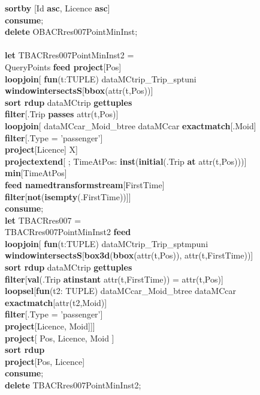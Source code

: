 \documentclass[a4paper]{article}
\newcommand{\op}[1]{\textbf{#1}}
\begin{document}
\begin{scriptsize}
\begin{tabbing}
\>\op{sortby} [Id \op{asc}, Licence \op{asc}]\\
\op{consume};\\
\op{delete} OBACRres007PointMinInst;\\
\\
\op{let} TBACRres007PointMinInst2 =\\
\>QueryPoints \op{feed project}[Pos]\\
\>\op{loopjoin}[ \op{fun}(t:TUPLE) dataMCtrip\_Trip\_sptuni \op{windowintersectsS}[\op{bbox}(attr(t,Pos))]\\
\>\>\op{sort rdup} dataMCtrip \op{gettuples}\\
\>\>\op{filter}[.Trip \op{passes} attr(t,Pos)]\\
\>\>\op{loopjoin}[ dataMCcar\_Moid\_btree dataMCcar \op{exactmatch}[.Moid]\\
\>\>\>\op{filter}[.Type = 'passenger']\\
\>\>\>\op{project}[Licence] {X}]\\
\>\>\op{projectextend}[ ; TimeAtPos: \op{inst}(\op{initial}(.Trip \op{at} attr(t,Pos)))]\\
\>\>\op{min}[TimeAtPos]\\
\>\>\op{feed namedtransformstream}[FirstTime]\\
\>\>\op{filter}[\op{not}(\op{isempty}(.FirstTime))]]\\
\op{consume};\\
\op{let} TBACRres007 =\\
\>TBACRres007PointMinInst2 \op{feed}\\
\>\op{loopjoin}[ \op{fun}(t:TUPLE) dataMCtrip\_Trip\_sptmpuni \op{windowintersectsS}[\op{box3d}(\op{bbox}(attr(t,Pos)), attr(t,FirstTime))]\\
\>\>\op{sort rdup} dataMCtrip \op{gettuples}\\
\>\>\op{filter}[\op{val}(.Trip \op{atinstant} attr(t,FirstTime)) = attr(t,Pos)]\\
\>\>\op{loopsel}[\op{fun}(t2: TUPLE) dataMCcar\_Moid\_btree dataMCcar \op{exactmatch}[attr(t2,Moid)]\\
\>\>\>\op{filter}[.Type = 'passenger']\\
\>\>\>\op{project}[Licence, Moid]]]\\
\>\op{project}[ Pos, Licence, Moid ]\\
\>\op{sort rdup}\\
\>\op{project}[Pos, Licence]\\
\op{consume};\\
\op{delete} TBACRres007PointMinInst2;\\

\end{tabbing}
\end{scriptsize}
\end{document}
